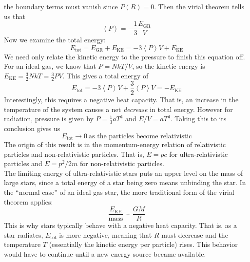 \documentclass[10pt]{article}
\numberwithin{equation}{section}
\newcommand{\n}{\noindent}
\newcommand{\avg}[1]{\left\langle#1\right\rangle}
\begin{document}
        the boundary terms must vanish since $P(R)=0$. Then the virial
        theorem tells us that
	\begin{equation}
		\label{rss.8}\boxed{\avg{P}=-\frac{1}{3}\frac{E_{\mathrm{GR}}}{V}}
	\end{equation}
	Now we examine the total energy:
	\begin{equation}
		\label{rss.9} E_{\mathrm{tot}}=E_{\mathrm{GR}}+E_{\mathrm{KE}}
=-3\avg{P}V+E_{\mathrm{KE}}
	\end{equation}
	We need only relate the kinetic energy to the pressure to finish this 
equation off. For an ideal gas, we know that $P=NkT/V$, so the kinetic 
energy is $E_{\mathrm{KE}}=\frac{3}{2}NkT=\frac{3}{2}PV$. This gives a 
total energy of
	\begin{equation}
		\label{rss.10} E_{\mathrm{tot}}=-3\avg{P}V+\frac{3}{2}\avg{P}V=-E_
{\mathrm{KE}}
	\end{equation}
	Interestingly, this requires a negative heat capacity. That is, an 
increase in the temperature of the system causes a net \emph{decrease} in 
total energy. However for radiation, pressure is given by $P=\frac{1}{3}
aT^4$ and $E/V=aT^4$. Taking this to its conclusion gives us
	\begin{equation}
		\label{rss.11} E_{\mathrm{tot}}\to 0\ \textrm{as the particles 
become relativistic}
	\end{equation}
	The origin of this result is in the momentum-energy relation of 
relativistic particles and non-relativistic particles. That is, $E=pc$ for 
ultra-relativistic particles and $E=p^2/2m$ for non-relativistic particles.
\\
	
	\n The limiting energy of ultra-relativistic stars puts an upper level 
on the mass of large stars, since a total energy of a star being zero means 
unbinding the star. In the ``normal case'' of an ideal gas star, the more 
traditional form of the virial theorem applies:
	\begin{equation}
		\label{rss.12} \frac{E_{\mathrm{KE}}}{\mathrm{mass}}\sim\frac{GM}
{R}
	\end{equation}
	This is why stars typically behave with a negative heat capacity. That 
is, as a star radiates, $E_{\mathrm{tot}}$ is more negative, meaning that 
$R$ must decrease and the temperature $T$ (essentially the kinetic energy 
per particle) rises. This behavior would have to continue until a new 
energy source became available.
\end{document}
